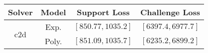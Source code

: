 \begin{tabular}{cc|c|c} 
\hline 
 Solver & Model & Support Loss  & Challenge Loss \tabularnewline\hline 
\hline 
\multirow{2}{*}{c2d} & Exp. & $\left[850.77,1035.2\right]$ & $\left[6397.4,6977.7\right]$ \tabularnewline 
 & Poly. & $\left[851.09,1035.7\right]$ & $\left[6235.2,6899.2\right]$ \tabularnewline 
\hline 
\end{tabular} 

